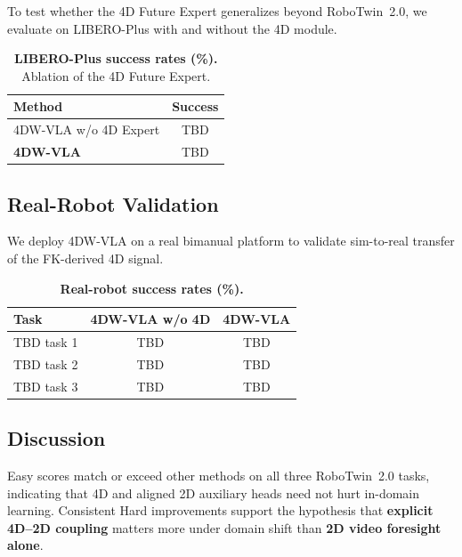 \documentclass[journal]{IEEEtran}
\begin{document}
To test whether the 4D Future Expert generalizes beyond RoboTwin~2.0, we
evaluate on LIBERO-Plus with and without the 4D module.

\begin{table}[!t]
\centering
\caption{\textbf{LIBERO-Plus success rates (\%).} Ablation of the 4D
Future Expert.}
\label{tab:libero}
\small
\begin{tabularx}{\linewidth}{@{}lC@{}}
\toprule
Method & Success \\
\midrule
4DW-VLA w/o 4D Expert  & TBD \\
\textbf{4DW-VLA}       & TBD \\
\bottomrule
\end{tabularx}
\end{table}


\subsection{Real-Robot Validation}
\label{sec:realrobot}

We deploy 4DW-VLA on a real bimanual platform to validate sim-to-real
transfer of the FK-derived 4D signal.

\begin{table}[!t]
\centering
\caption{\textbf{Real-robot success rates (\%).}}
\label{tab:realrobot}
\small
\begin{tabularx}{\linewidth}{@{}lCC@{}}
\toprule
Task & 4DW-VLA w/o 4D & \textbf{4DW-VLA} \\
\midrule
TBD task 1 & TBD & TBD \\
TBD task 2 & TBD & TBD \\
TBD task 3 & TBD & TBD \\
\bottomrule
\end{tabularx}
\end{table}


\subsection{Discussion}

Easy scores match or exceed other methods on all three RoboTwin~2.0
tasks, indicating that 4D and aligned 2D auxiliary heads need not hurt
in-domain learning. Consistent Hard improvements support the hypothesis
that \textbf{explicit 4D--2D coupling} matters more under domain shift
than \textbf{2D video foresight alone}.
\end{document}
